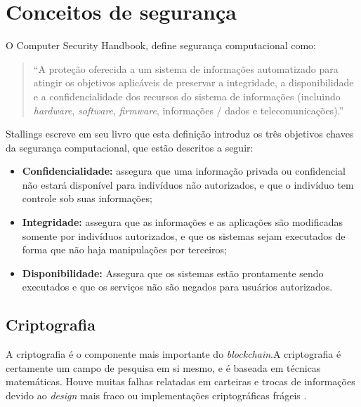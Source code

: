 \section{Conceitos de segurança}

    O Computer Security Handbook\cite{nist95}, define segurança computacional como:
    
     \begin{quote}
        ``A proteção oferecida a um sistema de informações automatizado para atingir os objetivos aplicáveis de preservar a integridade, a disponibilidade e a confidencialidade dos recursos do sistema de informações (incluindo \textit{hardware}, \textit{software}, \textit{firmware}, informações / dados e telecomunicações).''
     \end{quote}
     
     Stallings escreve em seu livro \cite{cryptograpy_and_network_stallings} que esta definição introduz os três objetivos chaves da segurança computacional, que estão descritos a seguir:
        
        \begin{itemize}
            \item \textbf{Confidencialidade:} assegura que uma informação privada ou confidencial não estará disponível para indivíduos não autorizados, e que o indivíduo tem controle sob suas informações;
            \item \textbf{Integridade:} assegura que as informações e as aplicações são modificadas somente por indivíduos autorizados, e que os sistemas sejam executados de forma que não haja manipulações por terceiros;
            \item \textbf{Disponibilidade:} Assegura que os sistemas estão prontamente sendo executados e que os serviços não são negados para usuários autorizados.
        \end{itemize}

    \subsection{Criptografia}
    
    A criptografia é o componente mais importante do \textit{blockchain}.A criptografia é certamente um campo de pesquisa em si mesmo, e é baseada em técnicas matemáticas. Houve muitas falhas relatadas em carteiras e trocas de informações devido ao \textit{design} mais fraco ou implementações criptográficas frágeis \cite{beginnig_blockchain_bikramaditya}.
    

